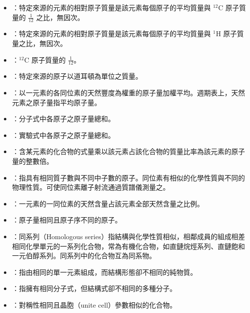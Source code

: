 \documentclass[a4paper,12pt]{article}
\begin{document}
\begin{itemize}
\item{}：特定來源的元素的相對原子質量是該元素每個原子的平均質量與 $^{12}$C 原子質量的 $\frac{1}{12}$ 之比，無因次。
\item{}：特定來源的元素的相對原子質量是該元素每個原子的平均質量與 $^1$H 原子質量之比，無因次。
\item{}：$^{12}$C 原子質量的 $\frac{1}{12}$。
\item{}：特定來源的原子以道耳頓為單位之質量。
\item{}：以一元素的各同位素的天然豐度為權重的原子量加權平均。週期表上，天然元素之原子量指平均原子量。
\item{}：分子式中各原子之原子量總和。
\item{}：實驗式中各原子之原子量總和。
\item{}：含某元素的化合物的式量乘以該元素占該化合物的質量比率為該元素的原子量的整數倍。
\item{}：指具有相同質子數與不同中子數的原子。同位素有相似的化學性質與不同的物理性質。可使同位素離子射流通過質譜儀測量之。
\item{}：一元素的一同位素的天然含量占該元素全部天然含量之比例。
\item{}：原子量相同且原子序不同的原子。
\item{}：同系列（Homologous series）指結構與化學性質相似，相鄰成員的組成相差相同化學單元的一系列化合物，常為有機化合物，如直鏈烷烴系列、直鏈飽和一元伯醇系列。同系列中的化合物互為同系物。
\item{}：指由相同的單一元素組成，而結構形態卻不相同的純物質。
\item{}：指擁有相同分子式，但結構式卻不相同的多種分子。
\item{}：對稱性相同且晶胞（unite cell）參數相似的化合物。
\end{itemize}
\end{document}
